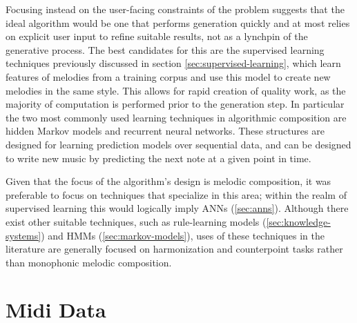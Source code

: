 \documentclass[ author={Stephen Livermore-Tozer},
				supervisor={Dr. Peter Flach},
				degree={MEng},
				title={Algorithmic Co-composition Using Machine Learning},
				subtitle={},
				type={research},
				year={2016} ]{dissertation}
\begin{document}
	Focusing instead on the user-facing constraints of the problem suggests that the ideal algorithm would be one that performs generation quickly and at most relies on explicit user input to refine suitable results, not as a lynchpin of the generative process. The best candidates for this are the supervised learning techniques previously discussed in section \ref{sec:supervised-learning}, which learn features of melodies from a training corpus and use this model to create new melodies in the same style. This allows for rapid creation of quality work, as the majority of computation is performed prior to the generation step. In particular the two most commonly used learning techniques in algorithmic composition are hidden Markov models and recurrent neural networks. These structures are designed for learning prediction models over sequential data, and can be designed to write new music by predicting the next note at a given point in time. 
	
	Given that the focus of the algorithm's design is melodic composition, it was preferable to focus on techniques that specialize in this area; within the realm of supervised learning this would logically imply ANNs (\ref{sec:anns}). Although there exist other suitable techniques, such as rule-learning models (\ref{sec:knowledge-systems}) and HMMs (\ref{sec:markov-models}), uses of these techniques in the literature are generally focused on harmonization and counterpoint tasks rather than monophonic melodic composition. 
	
	\section{Midi Data}
	\label{sec:midi-data}
%	
	
\end{document}
